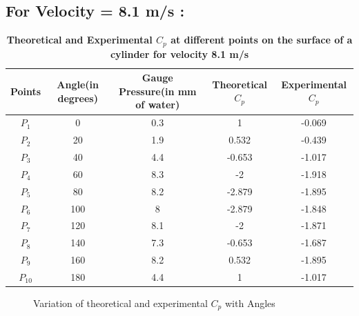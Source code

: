 \documentclass[12pt,a4paper]{article}
\begin{document}
\newpage
\subsection{For Velocity = 8.1 m/s : }
\begin{table}[ht]
\centering
\caption{\textbf{Theoretical and Experimental $C_p$ at different points on the surface of a cylinder for velocity 8.1 m/s}}
\vspace{2mm}
\begin{flushleft}
\begin{tabular}{|c|c|c|c|c|} 
 \hline
Points & Angle(in degrees) & Gauge Pressure(in mm of water) & Theoretical $C_p$ & Experimental $C_p$\\ [0.1ex] 
 \hline
$P_1$ & 0 & 0.3  & 1 & -0.069 \\ 
 \hline
$P_2$ & 20 & 1.9 & 0.532 & -0.439  \\
 \hline
$P_3$ & 40 & 4.4 & -0.653 & -1.017  \\
 \hline
 $P_4$ & 60 & 8.3 & -2 & -1.918  \\
 \hline
$P_5$ & 80 & 8.2 & -2.879 & -1.895  \\
 \hline
$P_6$ & 100 & 8 & -2.879 & -1.848 \\ 
 \hline
$P_7$ & 120 & 8.1 & -2 & -1.871 \\ 
 \hline
$P_8$ & 140 & 7.3 & -0.653 & -1.687\\
 \hline
$P_9$ & 160 & 8.2 & 0.532 & -1.895\\
 \hline
$P_{10}$ & 180 & 4.4 & 1 & -1.017 \\ 
 \hline 

\end{tabular}
\end{flushleft}
\end{table}

\begin{figure}[!ht]
	\begin{center}
	\end{center}
	\caption{Variation of theoretical and experimental $C_p$ with Angles}
\end{figure}
\end{document}
